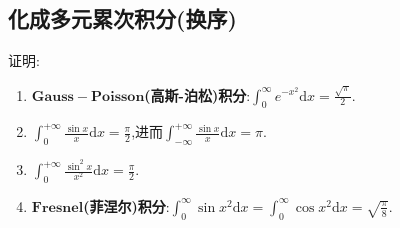\documentclass[../../main.tex]{subfiles}%
\begin{document}
\subsection{化成多元累次积分(换序)}

\begin{proposition}[重要定积分结论]\label{proposition:重要定积分结论}
证明:
\begin{enumerate}[(1)]
\item\label{proposition:重要定积分结论-1} $\mathbf{Gauss-Poisson}$\textbf{(高斯-泊松)积分}:\(\int_{0}^{\infty} e^{-x^{2}}\mathrm{d}x=\frac{\sqrt{\pi}}{2}\).

\item\label{proposition:重要定积分结论-2} \(\int_{0}^{+\infty} \frac{\sin x}{x}\mathrm{d}x=\frac{\pi}{2}\),进而$\int_{-\infty}^{+\infty} \frac{\sin x}{x}\mathrm{d}x=\pi$.

\item\label{proposition:重要定积分结论-3} $\int_0^{+\infty}{\frac{\sin ^2x}{x^2}\mathrm{d}x}=\frac{\pi}{2}.$

\item\label{proposition:重要定积分结论-4} $\mathbf{Fresnel}$\textbf{(菲涅尔)积分}:\(\int_{0}^{\infty} \sin x^{2}\mathrm{d}x=\int_{0}^{\infty} \cos x^{2}\mathrm{d}x=\sqrt{\frac{\pi}{8}}\). 
\end{enumerate}
\end{proposition}
\end{document}
